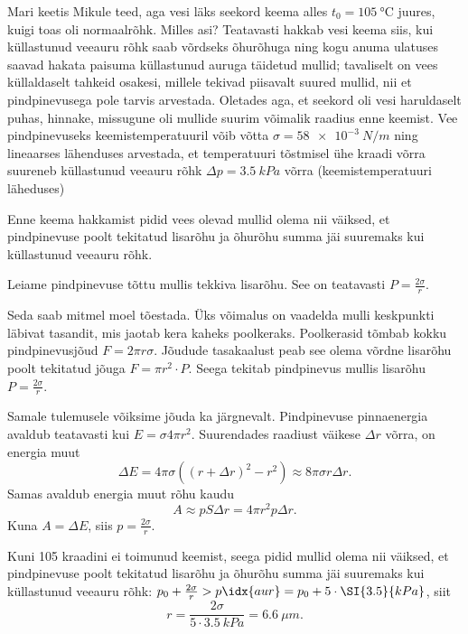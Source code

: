 
Mari keetis Mikule teed, aga vesi läks seekord keema alles $t_0= \SI{105}{\degreeCelsius}$ juures, kuigi toas oli normaalrõhk. Milles asi? Teatavasti hakkab vesi keema siis, kui küllastunud veeauru rõhk saab võrdseks õhurõhuga ning kogu anuma ulatuses saavad hakata paisuma küllastunud auruga täidetud mullid; tavaliselt on vees küllaldaselt tahkeid osakesi, millele tekivad piisavalt suured mullid, nii et pindpinevusega pole tarvis arvestada. Oletades aga, et seekord oli vesi haruldaselt puhas, hinnake, missugune oli mullide suurim võimalik raadius enne keemist. Vee pindpinevuseks keemistemperatuuril võib võtta $\sigma = \SI{58e-3}{N/m}$ ning lineaarses lähenduses arvestada, et temperatuuri tõstmisel ühe kraadi võrra suureneb küllastunud veeauru rõhk $\Delta p = \SI{3,5}{kPa}$ võrra (keemistemperatuuri läheduses)

\hint
Enne keema hakkamist pidid vees olevad mullid olema nii väiksed, et pindpinevuse poolt tekitatud lisarõhu ja õhurõhu summa jäi suuremaks kui küllastunud veeauru rõhk.

\solu
Leiame pindpinevuse tõttu mullis tekkiva lisarõhu. See on teatavasti $P = \frac{2\sigma}{r}$.

Seda saab mitmel moel tõestada. Üks võimalus on vaadelda mulli keskpunkti läbivat tasandit, mis jaotab kera kaheks poolkeraks. Poolkerasid tõmbab kokku pindpinevusjõud $F = 2\pi r\sigma$. Jõudude tasakaalust peab see olema võrdne lisarõhu poolt tekitatud jõuga $F = \pi r^2 \cdot P$. Seega tekitab pindpinevus mullis lisarõhu $P = \frac{2\sigma}{r}$.

Samale tulemusele võiksime jõuda ka järgnevalt. Pindpinevuse pinnaenergia avaldub teatavasti kui $E = \sigma 4\pi r^2$. Suurendades raadiust väikese $\Delta r$ võrra, on energia muut 
\[
\Delta E = 4\pi \sigma ((r+\Delta r)^2-r^2) \approx 8\pi \sigma r\Delta r.
\]
Samas avaldub energia muut rõhu kaudu
\[
A \approx pS\Delta r = 4\pi r^2p\Delta r.
\]
Kuna $A = \Delta E$, siis $p = \frac{2\sigma}{r}$.

Kuni 105 kraadini ei toimunud keemist, seega pidid mullid olema nii väiksed, et pindpinevuse poolt tekitatud lisarõhu ja õhurõhu summa jäi suuremaks kui küllastunud veeauru rõhk: $p_0 + \frac{2\sigma}{r} > p\idx{aur} = p_0 + 5 \cdot \SI{3.5}{kPa}$, siit 
\[
r = \frac{2\sigma}{5\cdot\SI{3.5}{kPa}} = \SI{6.6}{\mu m}.
\]
\probend